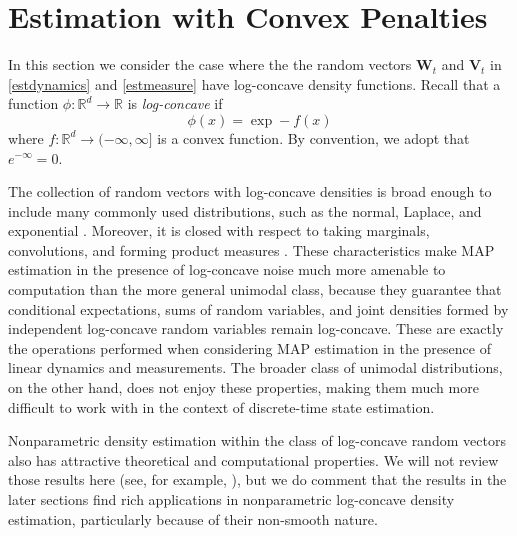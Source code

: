 \documentclass[12pt]{article}
\newcommand{\R}{{\mathbb R}}
\renewcommand{\vec}[1]{\mathbf{#1}}
\theoremstyle{remark}
\theoremstyle{remark}
\begin{document}


\section{Estimation with Convex Penalties}


In this section we consider the case where the 
 the random vectors $\vec{W}_{t}$ and $\vec{V}_{t}$ in
\eqref{estdynamics} and \eqref{estmeasure} 
have log-concave density functions. Recall that a function $\phi:\R^d \to
\R$ is \emph{log-concave} if 
$$ \phi(x) = \exp -f(x)$$
where $f: \R^d \to (-\infty, \infty]$ is a convex function.
By convention, we adopt that $e^{-\infty} =0$.

The collection of random vectors with log-concave densities is broad
 enough to include
many commonly used distributions, such as the normal,
Laplace, and exponential \cite{LogConcaveApp}. Moreover, it
is closed with respect to taking marginals, convolutions, and forming
product measures \cite{UniConvApp}. 
These characteristics make MAP estimation in the presence of log-concave 
noise much more amenable to computation than the more general unimodal
class, because they guarantee that conditional
expectations, sums of random variables, and joint densities formed by
independent log-concave random variables remain log-concave. These are
exactly the operations performed when considering MAP estimation in the presence
of linear dynamics and measurements. The broader class of unimodal
distributions, on the other hand, does not enjoy these properties,
making them much more difficult to work with in the context of
discrete-time state estimation.

Nonparametric density estimation
within the class of log-concave random vectors also has attractive theoretical and computational
properties. We will not review those results here (see, for example,
\cite{CRANPackage, pal, rufibach}), but we do comment that the results in the later
sections find rich applications in nonparametric log-concave density
estimation, particularly because of their non-smooth nature. 
\end{document}
